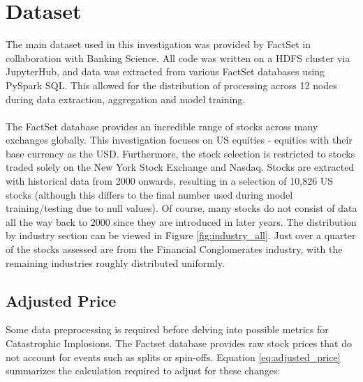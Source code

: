 \documentclass[a4paper]{report}
\begin{document}
\section{Dataset}
The main dataset used in this investigation was provided by FactSet in collaboration with Banking Science. All code was written on a HDFS cluster via JupyterHub, and data was extracted 
from various FactSet databases using PySpark SQL. This allowed for the distribution of processing across 12 nodes during data extraction, aggregation and model training.\\\\The FactSet database 
provides an incredible range of stocks across many exchanges globally. This investigation focuses on US equities - equities 
with their base currency as the USD. Furthermore, the stock selection is restricted to stocks traded solely on the New York Stock Exchange and Nasdaq. Stocks are extracted with historical 
data from 2000 onwards, resulting in a selection of 10,826 US stocks (although this differs to the final number used during model training/testing due to null values). Of course, many stocks do not consist of data all the way back to 2000 since they are introduced 
in later years. The distribution by industry section can be viewed in Figure \ref{fig:industry_all}. Just over a quarter of the stocks assessed are from the Financial Conglomerates industry, with 
the remaining industries roughly distributed uniformly.



\subsection{Adjusted Price}
Some data preprocessing is required before delving into possible metrics for Catastrophic Implosions. The Factset database provides raw stock prices that do not account for 
events such as splits or spin-offs. Equation \ref{eq:adjusted_price} summarizes the calculation required to adjust for these changes:
\end{document}
